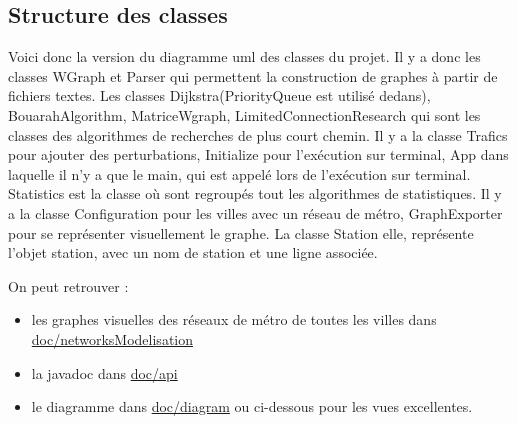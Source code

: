 \documentclass[french, 12pt]{article}
\begin{document}
\subsection{Structure des classes}
Voici donc la version du diagramme uml des classes du projet.
Il y a donc les classes WGraph et Parser qui permettent la construction de graphes à partir de fichiers textes. Les classes Dijkstra(PriorityQueue est utilisé dedans), BouarahAlgorithm, MatriceWgraph, LimitedConnectionResearch qui sont les classes des algorithmes de recherches de plus court chemin. Il y a la classe Trafics pour ajouter des perturbations, Initialize pour l'exécution sur terminal, App dans laquelle il n'y a que le main, qui est appelé lors de l'exécution sur terminal. Statistics est la classe où sont regroupés tout les algorithmes de statistiques. Il y a la classe Configuration pour les villes avec un réseau de métro, GraphExporter pour se représenter visuellement le graphe. La classe Station elle, représente l'objet station, avec un nom de station et une ligne associée.

On peut retrouver :
\begin{itemize}
\item les graphes visuelles des réseaux de métro de toutes les villes dans \url{doc/networksModelisation}
\item la javadoc dans \url{doc/api}
\item le diagramme dans \url{doc/diagram} ou ci-dessous pour les vues excellentes.
\end{itemize}





\end{document}
